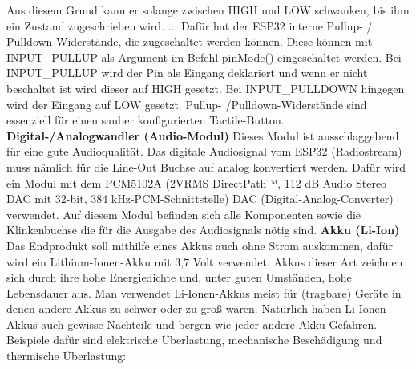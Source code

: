 \documentclass[11pt, twoside]{article}
\begin{document}
Aus diesem Grund kann er solange zwischen HIGH und LOW schwanken, bis ihm ein Zustand zugeschrieben wird.\grqq{} ... \glqq Dafür hat der ESP32 interne Pullup- / Pulldown-Widerstände, die zugeschaltet werden können. Diese können mit INPUT\_PULLUP als Argument im Befehl pinMode() eingeschaltet werden.
Bei INPUT\_PULLUP wird der Pin als Eingang deklariert und wenn er nicht beschaltet ist wird dieser auf HIGH gesetzt.
Bei INPUT\_PULLDOWN hingegen wird der Eingang auf LOW gesetzt.\grqq{} Pullup- /Pulldown-Widerstände sind essenziell für einen sauber konfigurierten Tactile-Button.
\vspace{4mm} \newline
\parencite[vgl.][]{noauthor_urlnl06_nodate}\newline
\parencite[vgl.][]{noauthor_urlnl07_2023}\newline
\parencite[vgl.][]{noauthor_urlnl08_nodate}
\vspace{4mm}\newline
\textbf{Digital-/Analogwandler (Audio-Modul)}\newline
Dieses Modul ist ausschlaggebend für eine gute Audioqualität. Das digitale Audiosignal vom ESP32 (Radiostream) muss nämlich für die Line-Out Buchse auf analog konvertiert werden. Dafür wird ein Modul mit dem PCM5102A (\glqq 2VRMS DirectPath™, 112 dB Audio Stereo DAC mit 32-bit, 384 kHz-PCM-Schnittstelle\grqq{}) DAC (Digital-Analog-Converter) verwendet. Auf diesem Modul befinden sich alle Komponenten sowie die Klinkenbuchse die für die Ausgabe des Audiosignals nötig sind.
\vspace{4mm} \newline
\parencite[vgl.][]{noauthor_urlnl09_nodate}
\vspace{4mm}\newline
\textbf{Akku (Li-Ion)}\newline
Das Endprodukt soll mithilfe eines Akkus auch ohne Strom auskommen, dafür wird ein Lithium-Ionen-Akku mit 3,7 Volt verwendet. Akkus dieser Art zeichnen sich durch ihre hohe Energiedichte und, unter guten Umständen, hohe Lebensdauer aus. Man verwendet Li-Ionen-Akkus meist für (tragbare) Geräte in denen andere Akkus zu schwer oder zu groß wären. \parencite[vgl.][]{noauthor_urlnl10_nodate} \vspace{4mm}\newline
Natürlich haben Li-Ionen-Akkus auch gewisse Nachteile und bergen wie jeder andere Akku Gefahren. Beispiele dafür sind elektrische Überlastung, mechanische Beschädigung und thermische Überlastung:
\end{document}

